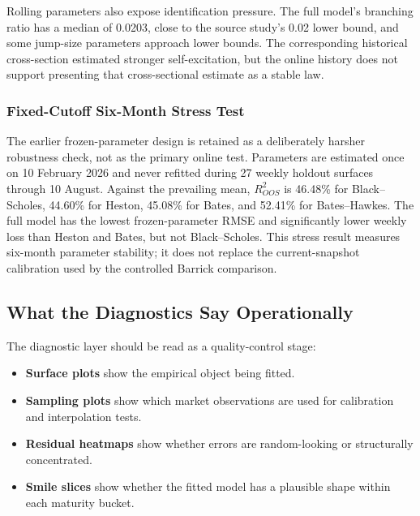 Rolling parameters also expose identification pressure. The full model's branching ratio has a median of 0.0203, close to the source study's 0.02 lower bound, and some jump-size parameters approach lower bounds. The corresponding historical cross-section estimated stronger self-excitation, but the online history does not support presenting that cross-sectional estimate as a stable law.
\subsubsection{Fixed-Cutoff Six-Month Stress Test}

The earlier frozen-parameter design is retained as a deliberately harsher robustness check, not as the primary online test. Parameters are estimated once on 10 February 2026 and never refitted during 27 weekly holdout surfaces through 10 August. Against the prevailing mean, \(R^2_{OOS}\) is 46.48\% for Black--Scholes, 44.60\% for Heston, 45.08\% for Bates, and 52.41\% for Bates--Hawkes. The full model has the lowest frozen-parameter RMSE and significantly lower weekly loss than Heston and Bates, but not Black--Scholes. This stress result measures six-month parameter stability; it does not replace the current-snapshot calibration used by the controlled Barrick comparison.


\subsection{What the Diagnostics Say Operationally}

The diagnostic layer should be read as a quality-control stage:

\begin{itemize}[leftmargin=8mm, itemsep=2pt]
    \item \textbf{Surface plots} show the empirical object being fitted.
    \item \textbf{Sampling plots} show which market observations are used for calibration and interpolation tests.
    \item \textbf{Residual heatmaps} show whether errors are random-looking or structurally concentrated.
    \item \textbf{Smile slices} show whether the fitted model has a plausible shape within each maturity bucket.
\end{itemize}




